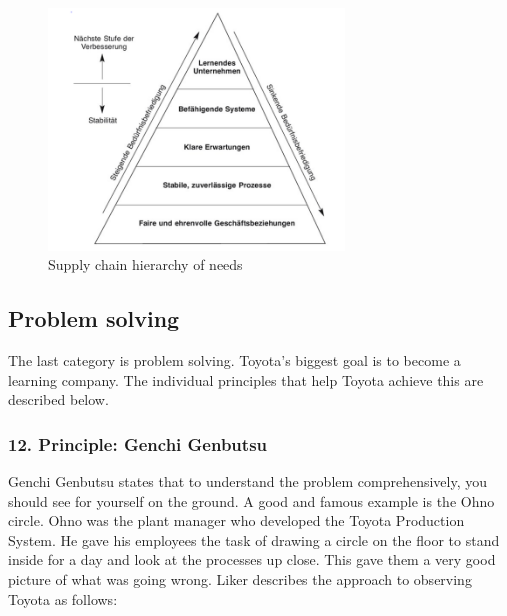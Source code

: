 \documentclass[a4paper,12pt]{scrartcl}
\begin{document}
\begin{figure}[h] 
  \centering
     \includegraphics[width=0.7\textwidth]{Netzwerk.png}
  \caption{Supply chain hierarchy of needs}
  \label{Netzwerk}
\end{figure}


\subsection{Problem solving}

The last category is problem solving. Toyota's biggest goal is to become a learning company. The individual principles that help Toyota achieve this are described below.

\subsubsection{12. Principle: Genchi Genbutsu}

Genchi Genbutsu states that to understand the problem comprehensively, you should see for yourself on the ground. A good and famous example is the Ohno circle. Ohno was the plant manager who developed the Toyota Production System. He gave his employees the task of drawing a circle on the floor to stand inside for a day and look at the processes up close. This gave them a very good picture of what was going wrong. Liker describes the approach to observing Toyota as follows:
\end{document}
